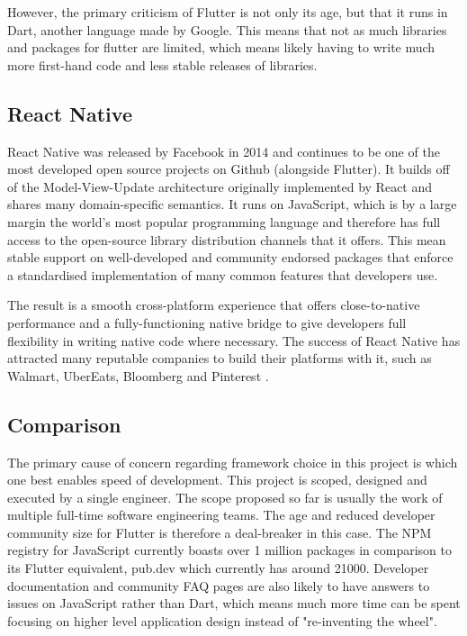 However, the primary criticism of Flutter is not only its age, but that it runs in Dart, another language made by Google. This means that not as much libraries and packages for flutter are limited, which means likely having to write much more first-hand code and less stable releases of libraries.


\subsection{React Native}
React Native was released by Facebook in 2014 and continues to be one of the most developed open source projects on Github (alongside Flutter). It builds off of the Model-View-Update architecture originally implemented by React and shares many domain-specific semantics. It runs on JavaScript, which is by a large margin the world's most popular programming language \cite{sfdevsurvey} and therefore has full access to the open-source library distribution channels that it offers. This mean stable support on well-developed and community endorsed packages that enforce a standardised implementation of many common features that developers use.

The result is a smooth cross-platform experience that offers close-to-native performance and a fully-functioning native bridge to give developers full flexibility in writing native code where necessary. The success of React Native has attracted many reputable companies to build their platforms with it, such as Walmart, UberEats, Bloomberg and Pinterest \cite{rnplatforms}.

\subsection{Comparison}
The primary cause of concern regarding framework choice in this project is which one best enables speed of development. This project is scoped, designed and executed by a single engineer. The scope proposed so far is usually the work of multiple full-time software engineering teams. The age and reduced developer community size for Flutter is therefore a deal-breaker in this case. The NPM registry for JavaScript currently boasts over 1 million packages in comparison to its Flutter equivalent, pub.dev which currently has around 21000. Developer documentation and community FAQ pages are also likely to have answers to issues on JavaScript rather than Dart, which means much more time can be spent focusing on higher level application design instead of "re-inventing the wheel".

